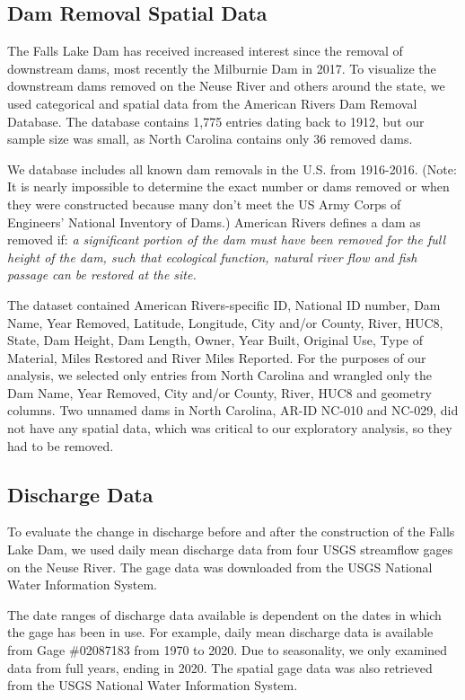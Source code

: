 \documentclass[
  12pt,
]{article}
\begin{document}
\hypertarget{dam-removal-spatial-data}{%
\subsection{Dam Removal Spatial Data}\label{dam-removal-spatial-data}}

The Falls Lake Dam has received increased interest since the removal of
downstream dams, most recently the Milburnie Dam in 2017. To visualize
the downstream dams removed on the Neuse River and others around the
state, we used categorical and spatial data from the American Rivers Dam
Removal Database. The database contains 1,775 entries dating back to
1912, but our sample size was small, as North Carolina contains only 36
removed dams.

We database includes all known dam removals in the U.S. from 1916-2016.
(Note: It is nearly impossible to determine the exact number or dams
removed or when they were constructed because many don't meet the US
Army Corps of Engineers' National Inventory of Dams.) American Rivers
defines a dam as removed if: \emph{a significant portion of the dam must
have been removed for the full height of the dam, such that ecological
function, natural river flow and fish passage can be restored at the
site.}

The dataset contained American Rivers-specific ID, National ID number,
Dam Name, Year Removed, Latitude, Longitude, City and/or County, River,
HUC8, State, Dam Height, Dam Length, Owner, Year Built, Original Use,
Type of Material, Miles Restored and River Miles Reported. For the
purposes of our analysis, we selected only entries from North Carolina
and wrangled only the Dam Name, Year Removed, City and/or County, River,
HUC8 and geometry columns. Two unnamed dams in North Carolina, AR-ID
NC-010 and NC-029, did not have any spatial data, which was critical to
our exploratory analysis, so they had to be removed.

\hypertarget{discharge-data}{%
\subsection{Discharge Data}\label{discharge-data}}

To evaluate the change in discharge before and after the construction of
the Falls Lake Dam, we used daily mean discharge data from four USGS
streamflow gages on the Neuse River. The gage data was downloaded from
the USGS National Water Information System.

The date ranges of discharge data available is dependent on the dates in
which the gage has been in use. For example, daily mean discharge data
is available from Gage \#02087183 from 1970 to 2020. Due to seasonality,
we only examined data from full years, ending in 2020. The spatial gage
data was also retrieved from the USGS National Water Information System.
\end{document}
